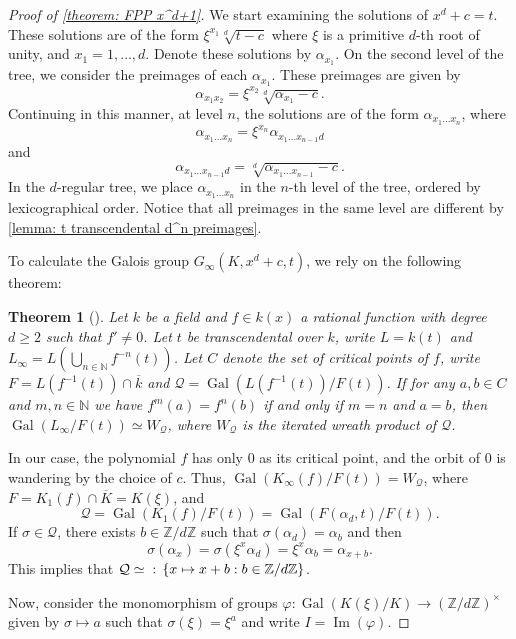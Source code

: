 \documentclass{amsart}
\def\set#1{{\def\st{\;:\;}\left\{#1\right\}}}
\def\ZZ{\mathbb Z}
\def\NN{\mathbb N}
\DeclareMathOperator{\Gal}{Gal}
\DeclareMathOperator{\st}{st}
\DeclareMathOperator{\IIm}{Im}
\newtheorem{theorem}[Proposition]{Theorem}
\begin{document}
\begin{proof}[Proof of \cref{theorem: FPP x^d+1}]

We start examining the solutions of $x^d + c = t$. These solutions are of the form $\xi^{x_1} \sqrt[d]{t-c}$ where $\xi$ is a primitive $d$-th root of unity, and $x_1 = 1,\dots,d$. Denote these solutions by $\alpha_{x_1}$. On the second level of the tree, we consider the preimages of each $\alpha_{x_1}$. These preimages are given by $$\alpha_{x_1 x_2} = \xi^{x_2} \sqrt[d]{\alpha_{x_1} - c}.$$ Continuing in this manner, at level $n$, the solutions are of the form $\alpha_{x_1 \dots x_n}$, where $$\alpha_{x_1 \dots x_n} = \xi^{x_n} \alpha_{x_1 \dots x_{n-1}d}$$ and $$\alpha_{x_1 \dots x_{n-1}d} = \sqrt[d]{\alpha_{x_1\dots x_{n-1}} - c}.$$ In the $d$-regular tree, we place $\alpha_{x_1\dots x_n}$ in the $n$-th level of the tree, ordered by lexicographical order. Notice that all preimages in the same level are different by \cref{lemma: t transcendental d^n preimages}.

To calculate the Galois group $G_\infty(K,x^d+c,t)$, we rely on the following theorem:

\begin{theorem}[{\cite[Theorem 3.1]{Juul2014}}]
Let $k$ be a field and $f \in k(x)$ a rational function with degree $d \geq 2$ such that $f' \neq 0$. Let $t$ be transcendental over $k$, write $L = k(t)$ and $L_\infty =  L \left( \bigcup_{n \in \NN} f^{-n}(t) \right)$. Let $C$ denote the set of critical points of $f$, write $F = L(f^{-1}(t)) \cap \overline{k}$ and $\mathcal{Q} = \Gal(L(f^{-1}(t))/F(t))$. If for any $a,b \in C$ and $m,n \in \NN$ we have $f^m(a) = f^n(b)$ if and only if $m = n$ and $a = b$, then $\Gal(L_\infty/F(t)) \simeq W_\mathcal{Q}$, where $W_\mathcal{Q}$ is the iterated wreath product of $\mathcal{Q}$.
\label{teo_GaloisGroup_wreathproduct_TuckerJuul}
\end{theorem}

In our case, the polynomial $f$ has only $0$ as its critical point, and the orbit of $0$ is wandering by the choice of $c$. Thus, $\Gal(K_\infty(f)/F(t)) = W_\mathcal{Q}$, where $F = K_1(f) \cap \overline{K} = K(\xi)$, and $$\mathcal{Q} = \Gal(K_1(f)/F(t)) = \Gal(F(\alpha_d,t)/F(t)).$$ If $\sigma \in \mathcal{Q}$, there exists $b \in \ZZ/d\ZZ$ such that $\sigma(\alpha_d) = \alpha_b$ and then $$\sigma(\alpha_x) = \sigma(\xi^x \alpha_d) = \xi^x \alpha_b = \alpha_{x + b}.$$ This implies that $\mathcal{Q} \simeq \set{x \mapsto x+b: b \in \ZZ/d \ZZ}$.

Now, consider the monomorphism of groups $\varphi: \Gal(K(\xi)/K) \rightarrow (\ZZ/d\ZZ)^\times$ given by $\sigma \mapsto a$ such that $\sigma(\xi) = \xi^a$ and write $I = \IIm(\varphi)$.


\end{proof}
\end{document}

